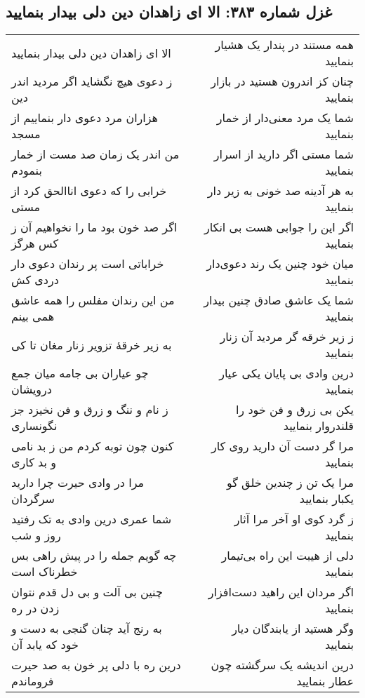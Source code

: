 \begin{center}
\section*{غزل شماره ۳۸۳: الا ای زاهدان دین دلی بیدار بنمایید}
\label{sec:383}
\begin{longtable}{l p{0.5cm} r}
الا ای زاهدان دین دلی بیدار بنمایید
&&
همه مستند در پندار یک هشیار بنمایید
\\
ز دعوی هیچ نگشاید اگر مردید اندر دین
&&
چنان کز اندرون هستید در بازار بنمایید
\\
هزاران مرد دعوی دار بنماییم از مسجد
&&
شما یک مرد معنی‌دار از خمار بنمایید
\\
من اندر یک زمان صد مست از خمار بنمودم
&&
شما مستی اگر دارید از اسرار بنمایید
\\
خرابی را که دعوی اناالحق کرد از مستی
&&
به هر آدینه صد خونی به زیر دار بنمایید
\\
اگر صد خون بود ما را نخواهیم آن ز کس هرگز
&&
اگر این را جوابی هست بی انکار بنمایید
\\
خراباتی است پر رندان دعوی دار دردی کش
&&
میان خود چنین یک رند دعوی‌دار بنمایید
\\
من این رندان مفلس را همه عاشق همی بینم
&&
شما یک عاشق صادق چنین بیدار بنمایید
\\
به زیر خرقهٔ تزویر زنار مغان تا کی
&&
ز زیر خرقه گر مردید آن زنار بنمایید
\\
چو عیاران بی جامه میان جمع درویشان
&&
درین وادی بی پایان یکی عیار بنمایید
\\
ز نام و ننگ و زرق و فن نخیزد جز نگونساری
&&
یکن بی زرق و فن خود را قلندروار بنمایید
\\
کنون چون توبه کردم من ز بد نامی و بد کاری
&&
مرا گر دست آن دارید روی کار بنمایید
\\
مرا در وادی حیرت چرا دارید سرگردان
&&
مرا یک تن ز چندین خلق گو یکبار بنمایید
\\
شما عمری درین وادی به تک رفتید روز و شب
&&
ز گرد کوی او آخر مرا آثار بنمایید
\\
چه گویم جمله را در پیش راهی بس خطرناک است
&&
دلی از هیبت این راه بی‌تیمار بنمایید
\\
چنین بی آلت و بی دل قدم نتوان زدن در ره
&&
اگر مردان این راهید دست‌افزار بنمایید
\\
به رنج آید چنان گنجی به دست و خود که یابد آن
&&
وگر هستید از یابندگان دیار بنمایید
\\
درین ره با دلی پر خون به صد حیرت فروماندم
&&
درین اندیشه یک سرگشته چون عطار بنمایید
\\
\end{longtable}
\end{center}
